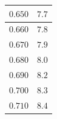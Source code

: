 \documentclass[letterpaper, 12pt]{article}
\begin{document}
\begin{longtable}{|c|c|}
    \hline
    $0.650$                                                                                                                                                                     & $7.7$                                                                                                                                                                                  \\
    \hline
    $0.660$                                                                                                                                                                     & $7.8$                                                                                                                                                                                  \\
    \hline
    $0.670$                                                                                                                                                                     & $7.9$                                                                                                                                                                                  \\
    \hline
    $0.680$                                                                                                                                                                     & $8.0$                                                                                                                                                                                  \\
    \hline
    $0.690$                                                                                                                                                                     & $8.2$                                                                                                                                                                                  \\
    \hline
    $0.700$                                                                                                                                                                     & $8.3$                                                                                                                                                                                  \\
    \hline
    $0.710$                                                                                                                                                                     & $8.4$                                                                                                                                                                                  \\

\end{longtable}
\end{document}

